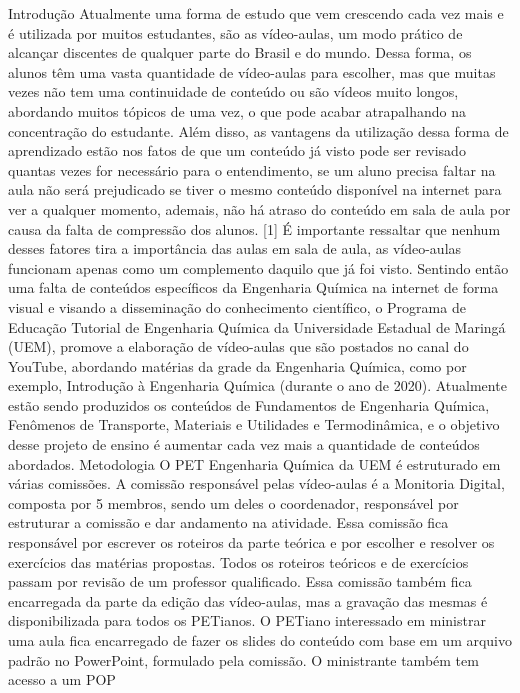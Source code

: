 Introdução
Atualmente uma forma de estudo que vem crescendo cada vez mais e é utilizada por 
muitos estudantes, são as vídeo-aulas, um modo prático de alcançar discentes de qualquer parte
do Brasil e do mundo. Dessa forma, os alunos têm uma vasta quantidade de vídeo-aulas para 
escolher, mas que muitas vezes não tem uma continuidade de conteúdo ou são vídeos muito 
longos, abordando muitos tópicos de uma vez, o que pode acabar atrapalhando na concentração
do estudante.
Além disso, as vantagens da utilização dessa forma de aprendizado estão nos fatos de que 
um conteúdo já visto pode ser revisado quantas vezes for necessário para o entendimento, se um 
aluno precisa faltar na aula não será prejudicado se tiver o mesmo conteúdo disponível na 
internet para ver a qualquer momento, ademais, não há atraso do conteúdo em sala de aula por 
causa da falta de compressão dos alunos. [1] É importante ressaltar que nenhum desses fatores tira 
a importância das aulas em sala de aula, as vídeo-aulas funcionam apenas como um 
complemento daquilo que já foi visto.
Sentindo então uma falta de conteúdos específicos da Engenharia Química na internet de 
forma visual e visando a disseminação do conhecimento científico, o Programa de Educação 
Tutorial de Engenharia Química da Universidade Estadual de Maringá (UEM), promove a 
elaboração de vídeo-aulas que são postados no canal do YouTube, abordando matérias da grade 
da Engenharia Química, como por exemplo, Introdução à Engenharia Química (durante o ano de 
2020). Atualmente estão sendo produzidos os conteúdos de Fundamentos de Engenharia 
Química, Fenômenos de Transporte, Materiais e Utilidades e Termodinâmica, e o objetivo desse
projeto de ensino é aumentar cada vez mais a quantidade de conteúdos abordados.
Metodologia
O PET Engenharia Química da UEM é estruturado em várias comissões. A comissão 
responsável pelas vídeo-aulas é a Monitoria Digital, composta por 5 membros, sendo um deles o 
coordenador, responsável por estruturar a comissão e dar andamento na atividade. Essa comissão 
fica responsável por escrever os roteiros da parte teórica e por escolher e resolver os exercícios 
das matérias propostas. Todos os roteiros teóricos e de exercícios passam por revisão de um 
professor qualificado. 
Essa comissão também fica encarregada da parte da edição das vídeo-aulas, mas a 
gravação das mesmas é disponibilizada para todos os PETianos. O PETiano interessado em 
ministrar uma aula fica encarregado de fazer os slides do conteúdo com base em um arquivo 
padrão no PowerPoint, formulado pela comissão. O ministrante também tem acesso a um POP 
